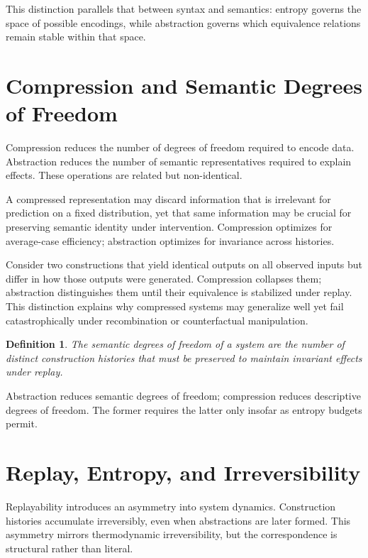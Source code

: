 \documentclass[11pt]{article}
\newtheorem{definition}{Definition}[section]
\begin{document}
This distinction parallels that between syntax and semantics: entropy governs the space of possible encodings, while abstraction governs which equivalence relations remain stable within that space.

\section{Compression and Semantic Degrees of Freedom}

Compression reduces the number of degrees of freedom required to encode data. Abstraction reduces the number of semantic representatives required to explain effects. These operations are related but non-identical.

A compressed representation may discard information that is irrelevant for prediction on a fixed distribution, yet that same information may be crucial for preserving semantic identity under intervention. Compression optimizes for average-case efficiency; abstraction optimizes for invariance across histories.

Consider two constructions that yield identical outputs on all observed inputs but differ in how those outputs were generated. Compression collapses them; abstraction distinguishes them until their equivalence is stabilized under replay. This distinction explains why compressed systems may generalize well yet fail catastrophically under recombination or counterfactual manipulation.

\begin{definition}
The semantic degrees of freedom of a system are the number of distinct construction histories that must be preserved to maintain invariant effects under replay.
\end{definition}

Abstraction reduces semantic degrees of freedom; compression reduces descriptive degrees of freedom. The former requires the latter only insofar as entropy budgets permit.

\section{Replay, Entropy, and Irreversibility}

Replayability introduces an asymmetry into system dynamics. Construction histories accumulate irreversibly, even when abstractions are later formed. This asymmetry mirrors thermodynamic irreversibility, but the correspondence is structural rather than literal.
\end{document}
